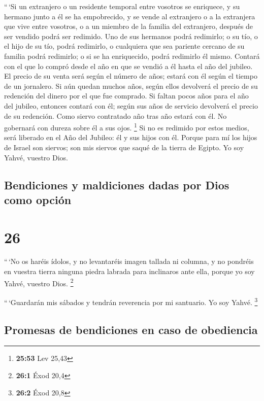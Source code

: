  ``\,`Si un extranjero o un residente temporal entre
vosotros se enriquece, y su hermano junto a él se ha empobrecido, y se
vende al extranjero o a la extranjera que vive entre vosotros, o a un
miembro de la familia del extranjero,  después de ser
vendido podrá ser redimido. Uno de sus hermanos podrá redimirlo;
 o su tío, o el hijo de su tío, podrá redimirlo, o
cualquiera que sea pariente cercano de su familia podrá redimirlo; o si
se ha enriquecido, podrá redimirlo él mismo.  Contará con
el que lo compró desde el año en que se vendió a él hasta el año del
jubileo. El precio de su venta será según el número de años; estará con
él según el tiempo de un jornalero.  Si aún quedan muchos
años, según ellos devolverá el precio de su redención del dinero por el
que fue comprado.  Si faltan pocos años para el año del
jubileo, entonces contará con él; según sus años de servicio devolverá
el precio de su redención.  Como siervo contratado año
tras año estará con él. No gobernará con dureza sobre él a sus ojos.
\footnote{\textbf{25:53} Lev 25,43}  Si no es redimido
por estos medios, será liberado en el Año del Jubileo: él y sus hijos
con él.  Porque para mí los hijos de Israel son siervos;
son mis siervos que saqué de la tierra de Egipto. Yo soy Yahvé, vuestro
Dios.

\hypertarget{bendiciones-y-maldiciones-dadas-por-dios-como-opciuxf3n}{%
\subsection{Bendiciones y maldiciones dadas por Dios como
opción}\label{bendiciones-y-maldiciones-dadas-por-dios-como-opciuxf3n}}

\hypertarget{section-25}{%
\section{26}\label{section-25}}

 ``\,`No os haréis ídolos, y no levantaréis imagen tallada
ni columna, y no pondréis en vuestra tierra ninguna piedra labrada para
inclinaros ante ella, porque yo soy Yahvé, vuestro Dios. \footnote{\textbf{26:1}
  Éxod 20,4}

 ``\,`Guardarán mis sábados y tendrán reverencia por mi
santuario. Yo soy Yahvé. \footnote{\textbf{26:2} Éxod 20,8}

\hypertarget{promesas-de-bendiciones-en-caso-de-obediencia}{%
\subsection{Promesas de bendiciones en caso de
obediencia}\label{promesas-de-bendiciones-en-caso-de-obediencia}}

